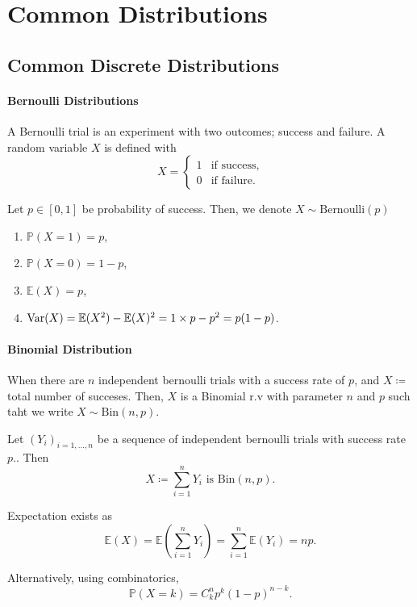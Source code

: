 \section{Common Distributions}

\subsection{Common Discrete Distributions}

\paragraph{Bernoulli Distributions}
A Bernoulli trial is an experiment with two outcomes;
success and failure.
A random variable \(X\) is defined with
\[
    X = \begin{cases}
        1 & \text{if  success}, \\
        0 & \text{if  failure}.
    \end{cases}
\]

Let \(p\in[0, 1]\) be probability of success. Then, we denote
\(X\sim \text{Bernoulli}(p)\)
\begin{enumerate}
    \item \(\mathbb{P}(X = 1) = p\),
    \item \(\mathbb{P}(X=0)  = 1-p\),
    \item \(\mathbb{E}(X) = p\),
    \item \(\mathrm{Var}(X) = \mathbb{E}(X^2) - \mathbb{E}(X)^2 = 1\times p - p^2 =
    p(1-p)\).
\end{enumerate}

\paragraph{Binomial Distribution}
When there are \(n\) independent bernoulli trials with
a success rate of \(p\), and \(X \coloneqq\) total number of succeses.
Then, \(X\) is a Binomial r.v with parameter \(n\) and \(p\)
such taht we write \(X\sim \text{Bin}(n, p)\).

Let \((Y_i)_{i=1, \dots, n}\) be a sequence of independent
bernoulli trials with success rate \(p\)..
Then \[
    X \coloneqq \sum_{i=1}^n Y_i \text{ is } \text{Bin}(n, p).
\]

Expectation exists as \[
    \mathbb{E}(X)
    = \mathbb{E}\left(\sum_{i=1}^{n} Y_i\right)
    = \sum_{i=1}^{n} \mathbb{E}(Y_i) = np.
\]

Alternatively, using combinatorics,
\[
    \mathbb{P}(X=k) = C^{n}_{k} p^k (1-p)^{n-k}.
\]

